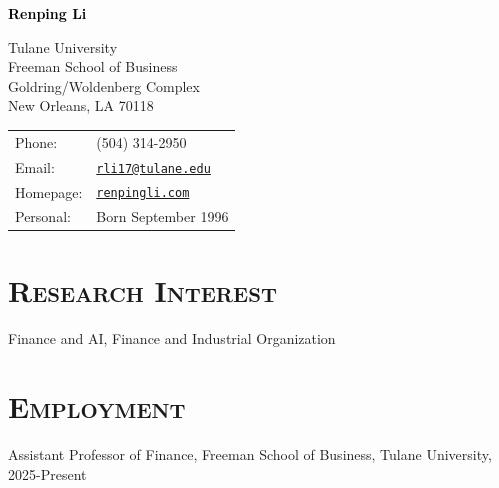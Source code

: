 \documentclass[11pt]{article}
\def\name{{\textcolor{black}{{{Renping Li}}}}}
\renewenvironment{itemize}{
  \begin{list}{}{
    \setlength{\leftmargin}{1.5em}
  }
}{
  \end{list}
}
\begin{document}

\centerline{\huge \bf \name}

\vspace{0.25in}

\begin{minipage}{0.45\linewidth}
  {Tulane University} \\
  Freeman School of Business \\
  Goldring/Woldenberg Complex \\
  New Orleans, LA 70118
\end{minipage}
\begin{minipage}{0.45\linewidth}
  \begin{tabular}{ll}
    Phone: & (504) 314-2950 \\
    Email: & \href{mailto:rli17@tulane.edu}{\tt rli17@tulane.edu} \\
    Homepage: & \href{https://renpingli.com}{\tt renpingli.com} \\
    Personal: & Born September 1996
  \end{tabular}
\end{minipage}



\section*{\textsc{Research Interest}}
\begin{itemize}
\item Finance and AI, Finance and Industrial Organization
\end{itemize}





\section*{\textsc{Employment}}

\begin{itemize}

\item Assistant Professor of Finance, Freeman School of Business, Tulane University, 2025-Present

\end{itemize}
\end{document}
